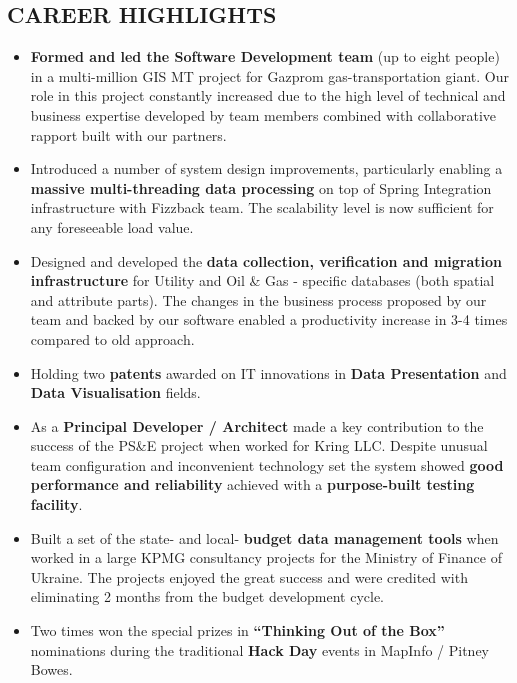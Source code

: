 \documentclass{res}
\begin{document}
\begin{resume}
\section{CAREER HIGHLIGHTS}
\begin{itemize}
\item {\bf Formed and led the Software Development team} (up to eight people) in a multi-million GIS MT project for Gazprom gas-transportation giant. Our role in this project constantly increased due to the high level of technical and business expertise developed by team members combined with collaborative rapport built with our partners.
\item Introduced a number of system design improvements, particularly enabling a {\bf massive multi-threading data processing} on top of Spring Integration infrastructure with Fizzback team. The scalability level is now sufficient for any foreseeable load value.
\item Designed and developed the {\bf data collection, verification and migration infrastructure} for Utility and Oil \& Gas - specific databases (both spatial and attribute parts). The changes in the business process proposed by our team and backed by our software enabled a productivity increase in 3-4 times compared to old approach.
\item Holding two {\bf patents} awarded on IT innovations in {\bf Data Presentation} and {\bf Data Visualisation} fields.
\item As a {\bf Principal Developer / Architect} made a key contribution to the success of the PS\&E project when worked for Kring LLC. Despite unusual team configuration and inconvenient technology set the system showed {\bf good performance and reliability} achieved with a {\bf purpose-built testing facility}.
\item Built a set of the state- and local- {\bf budget data management tools} when worked in a large KPMG consultancy projects for the Ministry of Finance of Ukraine. The projects enjoyed the great success and were credited with eliminating 2 months from the budget development cycle.
\item Two times won the special prizes in {\bf ``Thinking Out of the Box''} nominations during the traditional {\bf Hack Day} events in MapInfo / Pitney Bowes.
\end{itemize}
\fi


\end{resume}
\end{document}
